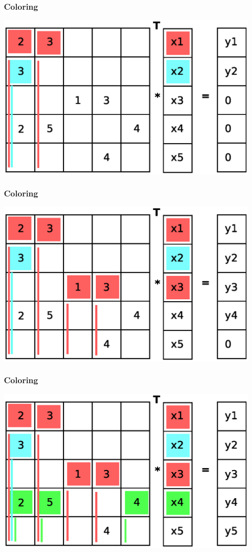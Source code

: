 \documentclass{beamer}
\begin{document}
\begin{frame}
\frametitle{Coloring}
\includegraphics[width=0.8\linewidth]{graphic/coloringT7.eps}
\end{frame}

\begin{frame}
\frametitle{Coloring}
\includegraphics[width=0.8\linewidth]{graphic/coloringT8.eps}
\end{frame}

\begin{frame}
\frametitle{Coloring}
\includegraphics[width=0.8\linewidth]{graphic/coloringT9.eps}
\end{frame}
\end{document}
